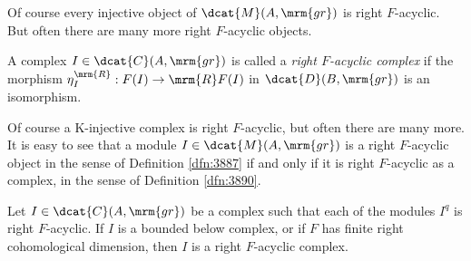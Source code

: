 Of course every injective object of $\dcat{M}(A, \mrm{gr})$ is right 
$F$-acyclic. But often there are many more right $F$-acyclic objects.

\begin{dfn} \label{dfn:3890}
A complex $I \in \dcat{C}(A, \mrm{gr})$ is called a {\em right $F$-acyclic 
complex} if the morphism $\eta^{\mrm{R}}_I : F(I) \to \mrm{R} F(I)$
in $\dcat{D}(B, \mrm{gr})$ is an isomorphism. 
\end{dfn}

Of course a K-injective complex is right $F$-acyclic, but often there 
are many more.
It is easy to see that a module 
$I \in \dcat{M}(A, \mrm{gr})$ is a right $F$-acyclic object
in the sense of Definition \ref{dfn:3887} if and only if it is right 
$F$-acyclic 
as a complex, in the sense of Definition \ref{dfn:3890}. 

\begin{lem} \label{lem:3885}
Let $I \in \dcat{C}(A, \mrm{gr})$ be a complex such that each of the modules  
$I^q$ is right $F$-acyclic. If $I$ is a bounded below complex, or if $F$ has 
finite right cohomological dimension, then $I$ is a right $F$-acyclic 
complex. 
\end{lem}

